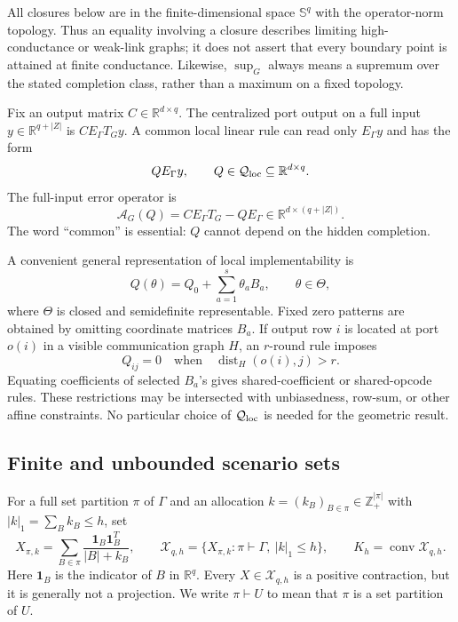 \documentclass[journal,10pt]{IEEEtran}
\theoremstyle{definition}
\theoremstyle{remark}
\newcommand{\R}{\mathbb R}
\newcommand{\Sph}{\mathbb S}
\newcommand{\one}{\mathbf 1}
\newcommand{\conv}{\operatorname{conv}}
\newcommand{\dist}{\operatorname{dist}}
\newcommand{\cX}{\mathcal X}
\newcommand{\cQ}{\mathcal Q}
\newcommand{\cA}{\mathcal A}
\begin{document}
All closures below are in the finite-dimensional space $\Sph^q$ with the
operator-norm topology.  Thus an equality involving a closure describes
limiting high-conductance or weak-link graphs; it does not assert that every
boundary point is attained at finite conductance.  Likewise, $\sup_G$ always
means a supremum over the stated completion class, rather than a maximum on a
fixed topology.

Fix an output matrix $C\in\R^{d\times q}$.  The centralized port output on a
full input $y\in\R^{q+|Z|}$ is $CE_\Gamma T_Gy$.  A common local linear rule can
read only $E_\Gamma y$ and has the form
\begin{equation}
  Q E_\Gamma y,\qquad Q\in\cQ_{\rm loc}\subseteq\R^{d\times q}.
  \label{eq:local-rule}
\end{equation}
The full-input error operator is
\begin{equation}
  \cA_G(Q)=CE_\Gamma T_G-QE_\Gamma
  \in\R^{d\times(q+|Z|)}.
  \label{eq:full-error}
\end{equation}
The word ``common'' is essential: $Q$ cannot depend on the hidden completion.

A convenient general representation of local implementability is
\begin{equation}
  Q(\theta)=Q_0+\sum_{a=1}^s\theta_aB_a,
  \qquad \theta\in\Theta,
  \label{eq:affine-rule}
\end{equation}
where $\Theta$ is closed and semidefinite representable.  Fixed zero patterns
are obtained by omitting coordinate matrices $B_a$.  If output row $i$ is
located at port $o(i)$ in a visible communication graph $H$, an $r$-round rule
imposes
\[
  Q_{ij}=0\quad\text{when}\quad \dist_H(o(i),j)>r.
\]
Equating coefficients of selected $B_a$'s gives shared-coefficient or
shared-opcode rules.  These restrictions may be intersected with unbiasedness,
row-sum, or other affine constraints.  No particular choice of
$\cQ_{\rm loc}$ is needed for the geometric result.

\subsection{Finite and unbounded scenario sets}

For a full set partition $\pi$ of $\Gamma$ and an allocation
$k=(k_B)_{B\in\pi}\in\mathbb Z_+^{|\pi|}$ with
$|k|_1=\sum_Bk_B\leq h$, set
\begin{equation}
  X_{\pi,k}
  =\sum_{B\in\pi}\frac{\one_B\one_B^T}{|B|+k_B},
  \qquad
  \cX_{q,h}=\{X_{\pi,k}:\pi\vdash\Gamma,\ |k|_1\leq h\},
  \qquad K_h=\conv\cX_{q,h}.
  \label{eq:finite-scenarios}
\end{equation}
Here $\one_B$ is the indicator of $B$ in $\R^q$.  Every
$X\in\cX_{q,h}$ is a positive contraction, but it is generally not a
projection.  We write $\pi\vdash U$ to mean that $\pi$ is a set partition of
$U$.
\end{document}
